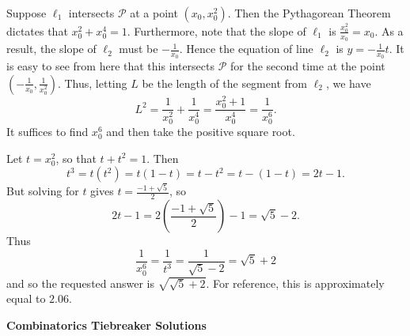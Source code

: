 \documentclass[10pt]{article}
\newcounter{enum}
\begin{document}
\begin{enumerate}
\par Suppose $\ell_1$ intersects $\mathcal P$ at a point $(x_0,x_0^2)$.  Then the Pythagorean Theorem dictates that $x_0^2+x_0^4 = 1$.  Furthermore, note that the slope of $\ell_1$ is $\tfrac{x_0^2}{x_0}=x_0$.  As a result, the slope of $\ell_2$ must be $-\tfrac{1}{x_0}$.  Hence the equation of line $\ell_2$ is $y = -\tfrac{1}{x_0}t$.  It is easy to see from here that this intersects $\mathcal P$ for the second time at the point $(-\tfrac{1}{x_0},\tfrac 1{x_0^2})$.  Thus, letting $L$ be the length of the segment from $\ell_2$, we have \[L^2 = \dfrac{1}{x_0^2}+\dfrac{1}{x_0^4} = \dfrac{x_0^2+1}{x_0^4} = \dfrac{1}{x_0^6}.\] It suffices to find $x_0^6$ and then take the positive square root.

\par Let $t=x_0^2$, so that $t+t^2 = 1$.  Then \[t^3 = t(t^2) = t(1-t) = t-t^2 = t-(1-t) = 2t-1.\] But solving for $t$ gives $t = \tfrac{-1+\sqrt 5}2$, so \[2t - 1 = 2\left(\dfrac{-1+\sqrt 5}2\right) - 1 =\sqrt 5 - 2.\] Thus \[\dfrac{1}{x_0^6} = \dfrac{1}{t^3} = \dfrac{1}{\sqrt{5}-2}=\sqrt 5 + 2\] and so the requested answer is $\boxed{\sqrt{\sqrt5+2}}$.  For reference, this is approximately equal to $2.06$.

\end{enumerate}


\newpage

\begin{center}
\huge\textbf{Combinatorics Tiebreaker Solutions}
\end{center}
\end{document}
